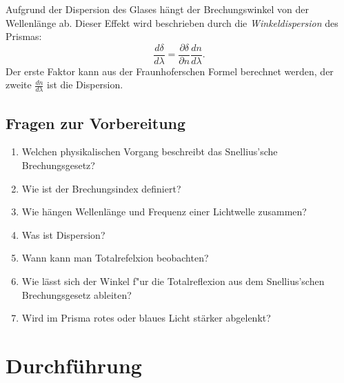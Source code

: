 \noindent
Aufgrund der Dispersion des Glases hängt der Brechungswinkel von der Wellenlänge ab. Dieser Effekt wird beschrieben durch die \textit{Winkeldispersion} des Prismas:
\begin{equation}
	\frac{d\delta}{d\lambda} = \frac{\partial\delta}{\partial n} \frac{dn}{d\lambda}.
\end{equation}
Der erste Faktor kann aus der Fraunhoferschen Formel berechnet werden, der zweite $\frac{dn}{d\lambda}$ ist die Dispersion.

\begin{tutorhint}
\section{Fragen zur Vorbereitung}

\begin{enumerate}
 \item Welchen physikalischen Vorgang beschreibt das Snellius'sche Brechungsgesetz?
 \item Wie ist der Brechungsindex definiert?
 \item Wie hängen Wellenlänge und Frequenz einer Lichtwelle zusammen?
 \item Was ist Dispersion?
 \item Wann kann man Totalrefelxion beobachten?
 \item Wie lässt sich der Winkel f"ur die Totalreflexion aus dem Snellius'schen Brechungsgesetz ableiten?
 \item Wird im Prisma rotes oder blaues Licht stärker abgelenkt?
\end{enumerate}
\end{tutorhint}

\section{Durchführung} 

